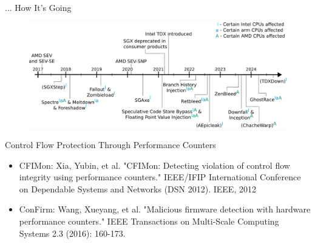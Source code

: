 \documentclass[aspectratio=169]{beamer}
\begin{document}
\begin{frame}{... How It’s Going}
    \begin{figure}
        \begin{center}
            \includegraphics[width=\textwidth]{images/timeline.pdf}
        \end{center}
    \end{figure}
\end{frame}
\begin{frame}{Control Flow Protection Through Performance Counters}
    \begin{itemize}
        \item CFIMon: Xia, Yubin, et al. "CFIMon: Detecting violation of control flow integrity using performance counters." {\footnotesize{IEEE/IFIP International Conference on Dependable Systems and Networks (DSN 2012). IEEE, 2012}}
        \item ConFirm: Wang, Xueyang, et al. "Malicious firmware detection with hardware performance counters." {\footnotesize{IEEE Transactions on Multi-Scale Computing Systems 2.3 (2016): 160-173.}}
    \end{itemize}
\end{frame}
\end{document}
